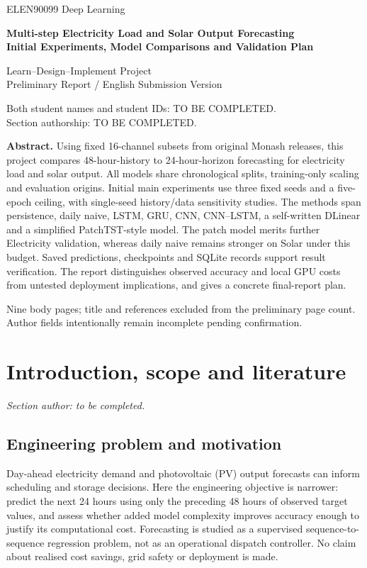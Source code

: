 \documentclass[10pt,a4paper]{article}
\begin{document}
\begin{titlepage}\thispagestyle{empty}\centering\vspace*{22mm}
{\Large ELEN90099 Deep Learning\par}\vspace{8mm}
{\LARGE\bfseries Multi-step Electricity Load and Solar Output Forecasting\\[4mm]Initial Experiments, Model Comparisons and Validation Plan\par}\vspace{10mm}
{\large Learn--Design--Implement Project\\Preliminary Report / English Submission Version\par}\vspace{12mm}
Both student names and student IDs: TO BE COMPLETED.\\[3mm]Section authorship: TO BE COMPLETED.
\vspace{12mm}\begin{minipage}{0.88\textwidth}
\textbf{Abstract. }Using fixed 16-channel subsets from original Monash releases, this project compares 48-hour-history to 24-hour-horizon forecasting for electricity load and solar output. All models share chronological splits, training-only scaling and evaluation origins. Initial main experiments use three fixed seeds and a five-epoch ceiling, with single-seed history/data sensitivity studies. The methods span persistence, daily naive, LSTM, GRU, CNN, CNN--LSTM, a self-written DLinear and a simplified PatchTST-style model. The patch model merits further Electricity validation, whereas daily naive remains stronger on Solar under this budget. Saved predictions, checkpoints and SQLite records support result verification. The report distinguishes observed accuracy and local GPU costs from untested deployment implications, and gives a concrete final-report plan.
\end{minipage}\vfill
Nine body pages; title and references excluded from the preliminary page count.\\Author fields intentionally remain incomplete pending confirmation.
\end{titlepage}\setcounter{page}{1}
\section{Introduction, scope and literature}
\noindent\textit{Section author: to be completed.}


\subsection{Engineering problem and motivation}
Day-ahead electricity demand and photovoltaic (PV) output forecasts can inform scheduling and storage decisions. Here the engineering objective is narrower: predict the next 24 hours using only the preceding 48 hours of observed target values, and assess whether added model complexity improves accuracy enough to justify its computational cost. Forecasting is studied as a supervised sequence-to-sequence regression problem, not as an operational dispatch controller. No claim about realised cost savings, grid safety or deployment is made.
\end{document}

